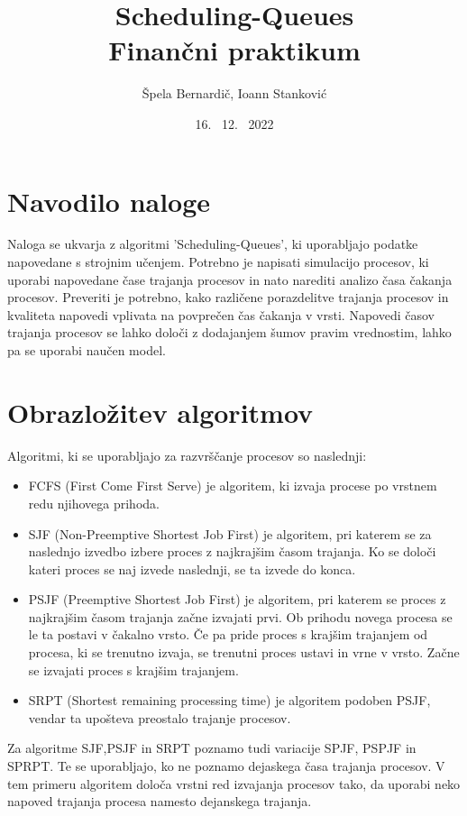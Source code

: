 \documentclass[a4paper, pt14]{article}
\begin{document}
\title{%
Scheduling-Queues\\
  \large Finančni praktikum}
\author{Špela Bernardič, Ioann Stanković}
\date{16. \ 12. \ 2022}

\maketitle

\section{Navodilo naloge}
Naloga se ukvarja z algoritmi 'Scheduling-Queues', ki uporabljajo podatke napovedane s strojnim učenjem.
Potrebno je napisati simulacijo procesov, ki uporabi napovedane čase trajanja procesov in nato narediti analizo časa čakanja procesov.
Preveriti je potrebno, kako različene porazdelitve trajanja procesov in kvaliteta napovedi vplivata na povprečen čas čakanja v vrsti.
Napovedi časov trajanja procesov se lahko določi z dodajanjem šumov pravim vrednostim, lahko pa se uporabi naučen model.


\section{Obrazložitev algoritmov}
Algoritmi, ki se uporabljajo za razvrščanje procesov so naslednji:
\begin{itemize}
  \item FCFS (First Come First Serve) je algoritem, ki izvaja procese po vrstnem redu njihovega prihoda.
  \item SJF (Non-Preemptive Shortest Job First) je algoritem, pri katerem se za naslednjo izvedbo izbere proces z najkrajšim časom trajanja. Ko se določi kateri proces se naj izvede naslednji, se ta izvede do konca. 
  \item PSJF (Preemptive Shortest Job First) je algoritem, pri katerem se proces z najkrajšim časom trajanja začne izvajati prvi. Ob prihodu novega procesa se le ta postavi v čakalno vrsto. Če pa pride proces s krajšim trajanjem od procesa, ki se trenutno izvaja, se trenutni proces ustavi in vrne v vrsto. Začne se izvajati proces s krajšim trajanjem.
  \item SRPT (Shortest remaining processing time) je algoritem podoben PSJF, vendar ta upošteva preostalo trajanje procesov.
\end{itemize}
Za algoritme SJF,PSJF in SRPT poznamo tudi variacije SPJF, PSPJF in SPRPT. Te se uporabljajo, ko ne poznamo dejaskega časa trajanja procesov. V tem primeru algoritem določa vrstni red izvajanja procesov tako, da uporabi neko napoved trajanja procesa namesto dejanskega trajanja.
\end{document}
